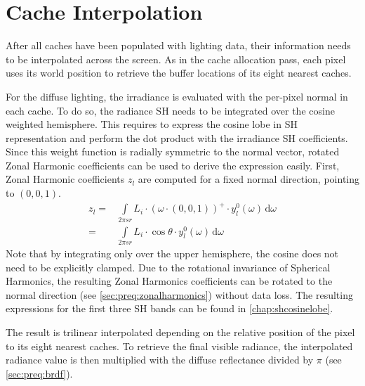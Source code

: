 \documentclass[thesis.tex]{subfiles}
\begin{document}
\section{Cache Interpolation}
After all caches have been populated with lighting data, their information needs to be interpolated across the screen.
As in the cache allocation pass, each pixel uses its world position to retrieve the buffer locations of its eight nearest caches.
 
For the diffuse lighting, the irradiance is evaluated with the per-pixel normal in each cache.
To do so, the radiance SH needs to be integrated over the cosine weighted hemisphere.
This requires to express the cosine lobe in SH representation and perform the dot product with the irradiance SH coefficients.
Since this weight function is radially symmetric to the normal vector, rotated Zonal Harmonic coefficients can be used to derive the expression easily.
First, Zonal Harmonic coefficients $z_l$ are computed for a fixed normal direction, pointing to $(0,0,1)$.
\begin{align}
z_l =&\int\limits_{2 \pi sr} L_i \cdot (\omega \cdot (0,0,1))^+ \cdot y^0_l(\omega) \,\mathrm{d}\omega\\
=&\int\limits_{2 \pi sr} L_i \cdot \cos\theta \cdot y^0_l(\omega) \,\mathrm{d}\omega
\end{align}
Note that by integrating only over the upper hemisphere, the cosine does not need to be explicitly clamped.
Due to the rotational invariance of Spherical Harmonics, the resulting Zonal Harmonics coefficients can be rotated to the normal direction (see \autoref{sec:preq:zonalharmonics}) without data loss.
The resulting expressions for the first three SH bands can be found in \autoref{chap:shcosinelobe}.

The result is trilinear interpolated depending on the relative position of the pixel to its eight nearest caches.
To retrieve the final visible radiance, the interpolated radiance value is then multiplied with the diffuse reflectance divided by $\pi$ (see \autoref{sec:preq:brdf}).
\end{document}
